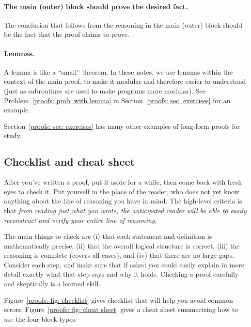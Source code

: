 \paragraph{The main (outer) block should prove the desired fact.}
The conclusion that follows from the reasoning in the main (outer) block
should be the fact that the proof claims to prove.

\paragraph{Lemmas.}
A lemma is like a ``small'' theorem.
In these notes, we use lemmas within the context of the main proof,
to make it modular and therefore easier to understand
(just as subroutines are used to make programs more modular).
See Problem~\ref{proofs: prob: with lemma} in Section~\ref{proofs: sec: exercises} for an example.

Section~\ref{proofs: sec: exercises} has many other examples of long-form proofs for study.


\subsection{Checklist and cheat sheet}
After you've written a proof,
put it aside for a while,
then come back with fresh eyes to check it.
Put yourself in the place of the reader,
who does not yet know anything about the line of reasoning you have in mind.
The high-level criteria is that
\emph{from reading just what you wrote,
the anticipated reader will be able to easily reconstruct and verify your entire line of reasoning.}

The main things to check are
(i) that each statement and definition is mathematically precise,
(ii) that the overall logical structure is correct,
(iii) the reasoning is complete (covers all cases),
and (iv) that there are no large gaps.
Consider each step, and make sure that if asked you could easily explain
in more detail exactly what that step says and why it holds.
Checking a proof carefully and skeptically is a learned skill.

Figure~\ref{proofs: fig: checklist} gives checklist that will help you avoid common errors.
Figure~\ref{proofs: fig: cheat sheet} gives a cheat sheet summarizing how to use the four block types.

